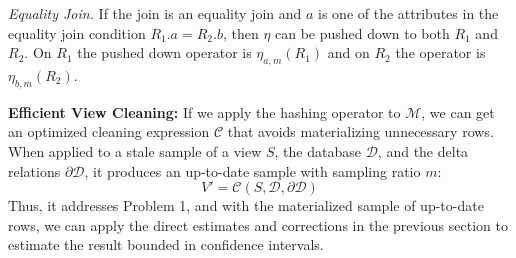 \emph{Equality Join. } If the join is an equality join and $a$ is one of the attributes in the equality join condition $R_1.a = R_2.b$, then $\eta$ can be pushed down to both $R_1$ and $R_2$. On $R_1$ the pushed down operator is $\eta_{a, m}(R_1)$ and on $R_2$ the operator is $\eta_{b, m}(R_2)$.

\vspace{0.5em} 

\noindent \textbf{Efficient View Cleaning: }
If we apply the hashing operator to $\mathcal{M}$, we can get an optimized cleaning expression $\mathcal{C}$ that avoids materializing unnecessary rows. 
When applied to a stale sample of a view $S$, the database $\mathcal{D}$, and the delta relations $\partial \mathcal{D}$, it produces an up-to-date sample with sampling ratio $m$:
\[
V' = \mathcal{C}(S,\mathcal{D},\partial \mathcal{D})
\]
Thus, it addresses Problem 1, and with the materialized sample of up-to-date rows, we can apply the direct estimates and corrections in the previous section to estimate the result bounded in confidence intervals.
